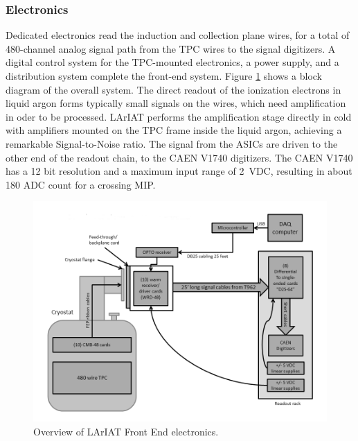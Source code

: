 \subsubsection{Electronics}

Dedicated electronics read the induction and collection plane wires, for a total of  480-channel analog signal path from the TPC wires to the signal digitizers. A digital control system for the TPC-mounted electronics, a power supply, and a distribution system complete the front-end system. Figure \ref{pic:FEelectronics} shows a block diagram of the overall system. The direct readout of the ionization electrons in liquid argon forms typically small signals on the wires, which need amplification in oder to be processed. LArIAT  performs the amplification stage directly in cold with  amplifiers %
mounted on the TPC frame inside the liquid argon, achieving a remarkable Signal-to-Noise ratio. %
The signal from the ASICs are driven to the other end of the readout chain, to the CAEN V1740 digitizers. The CAEN V1740 has a 12 bit resolution and a maximum input range of 2~VDC, resulting in about 180 ADC count for a crossing MIP.   

\begin{figure}[htbp]
 \centering
 \includegraphics[width=1.0\textwidth]{Chapter-3/Images/LArIAT_FE_Electronics.png}
\caption{Overview of LArIAT Front End electronics. } 
\label{pic:FEelectronics}
\end{figure}




